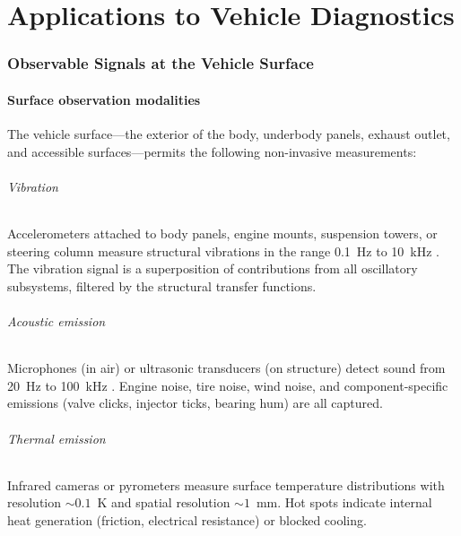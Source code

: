\documentclass[twocolumn,10pt,a4paper]{article}
\theoremstyle{definition}
\theoremstyle{remark}
\begin{document}

\part{Applications to Vehicle Diagnostics}

\section{Observable Signals at the Vehicle Surface}\label{sec:observables}

\subsection{Surface observation modalities}

The vehicle surface---the exterior of the body, underbody panels, exhaust outlet, and accessible surfaces---permits the following non-invasive measurements:

\paragraph{Vibration} Accelerometers attached to body panels, engine mounts, suspension towers, or steering column measure structural vibrations in the range 0.1~Hz to 10~kHz \citep{Randall2011, Harris2002}. The vibration signal is a superposition of contributions from all oscillatory subsystems, filtered by the structural transfer functions.

\paragraph{Acoustic emission} Microphones (in air) or ultrasonic transducers (on structure) detect sound from 20~Hz to 100~kHz \citep{Kinsler2000}. Engine noise, tire noise, wind noise, and component-specific emissions (valve clicks, injector ticks, bearing hum) are all captured.

\paragraph{Thermal emission} Infrared cameras or pyrometers measure surface temperature distributions with resolution $\sim 0.1$~K and spatial resolution $\sim 1$~mm. Hot spots indicate internal heat generation (friction, electrical resistance) or blocked cooling.
\end{document}
